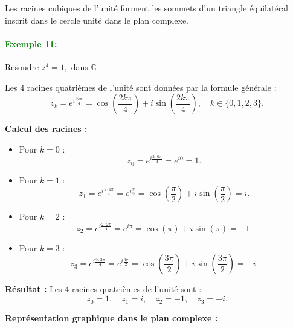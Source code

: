 \documentclass[12pt]{article}
\begin{document}
Les racines cubiques de l'unité forment les sommets d'un triangle équilatéral inscrit dans le cercle unité dans le plan complexe.


\paragraph{\underline{\textbf{\textcolor{green}{Exemple 11: }}}}

Resoudre \( z^4 = 1, \) dans $\mathbb{C}$

Les \(4\) racines quatrièmes de l’unité sont données par la formule générale :
\[
z_k = e^{i\frac{2k\pi}{4}} = \cos\left(\frac{2k\pi}{4}\right) + i\sin\left(\frac{2k\pi}{4}\right), \quad k \in \{0, 1, 2, 3\}.
\]

\textbf{Calcul des racines :}
\begin{itemize}
    \item Pour \(k = 0\) : 
    \[
    z_0 = e^{i\frac{2\cdot 0\pi}{4}} = e^{i0} = 1.
    \]
    \item Pour \(k = 1\) : 
    \[
    z_1 = e^{i\frac{2\cdot 1\pi}{4}} = e^{i\frac{\pi}{2}} = \cos\left(\frac{\pi}{2}\right) + i\sin\left(\frac{\pi}{2}\right) = i.
    \]
    \item Pour \(k = 2\) : 
    \[
    z_2 = e^{i\frac{2\cdot 2\pi}{4}} = e^{i\pi} = \cos(\pi) + i\sin(\pi) = -1.
    \]
    \item Pour \(k = 3\) : 
    \[
    z_3 = e^{i\frac{2\cdot 3\pi}{4}} = e^{i\frac{3\pi}{2}} = \cos\left(\frac{3\pi}{2}\right) + i\sin\left(\frac{3\pi}{2}\right) = -i.
    \]
\end{itemize}

\textbf{Résultat :} Les \(4\) racines quatrièmes de l’unité sont :
\[
z_0 = 1, \quad z_1 = i, \quad z_2 = -1, \quad z_3 = -i.
\]

\textbf{Représentation graphique dans le plan complexe :}

\begin{center}
\end{center}
\end{document}

